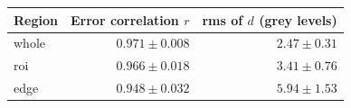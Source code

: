 \begin{tabular}{lrr}
\toprule
Region & Error correlation $r$ & rms of $d$ (grey levels) \\
\midrule
whole & $0.971 \pm 0.008$ & $2.47 \pm 0.31$ \\
roi & $0.966 \pm 0.018$ & $3.41 \pm 0.76$ \\
edge & $0.948 \pm 0.032$ & $5.94 \pm 1.53$ \\
\bottomrule
\end{tabular}
